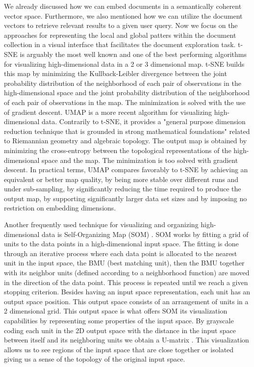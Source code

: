 \documentclass[a4paper]{article}
\begin{document}
We already discussed how we can embed documents in a semantically coherent vector space. Furthermore, we also mentioned how we can utilize the document vectors to retrieve relevant results to a given user query. Now we focus on the approaches for representing the local and global patters within the document collection in a visual interface that facilitates the document exploration task. t-SNE \citep{vandermaaten2008} is arguably the most well known and one of the best performing algorithms for visualizing high-dimensional data in a 2 or 3 dimensional map. t-SNE builds this map by minimizing the Kullback-Leibler divergence between the joint probability distribution of the neighborhood of each pair of observations in the high-dimensional space and the joint probability distribution of the neighborhood of each pair of observations in the map. The minimization is solved with the use of gradient descent. UMAP \citep{mcinnes2020} is a more recent algorithm for visualizing high-dimensional data. Contrarily to t-SNE, it provides a "general purpose dimension reduction technique that is grounded in strong mathematical foundations" \citep{mcinnes2020} related to Riemannian geometry and algebraic topology. The output map is obtained by minimizing the cross-entropy between the topological representations of the high-dimensional space and the map. The minimization is too solved with gradient descent. In practical terms, UMAP compares favorably to t-SNE \citep{mcinnes2020} by achieving an equivalent or better map quality, by being more stable over different runs and under sub-sampling, by significantly reducing the time required to produce the output map, by supporting significantly larger data set sizes and by imposing no restriction on embedding dimensions.

Another frequently used technique for visualizing and organizing high-dimensional data is Self-Organizing Map (SOM) \citep{Kohonen1982}. SOM works by fitting a grid of units to the data points in a high-dimensional input space. The fitting is done through an iterative process where each data point is allocated to the nearest unit in the input space, the BMU (best matching unit), then the BMU together with its neighbor units (defined according to a neighborhood function) are moved in the direction of the data point. This process is repeated until we reach a given stopping criterion. Besides having an input space representation, each unit has an output space position. This output space consists of an arrangement of units in a 2 dimensional grid. This output space is what offers SOM its visualization capabilities by representing some properties of the input space. By grayscale coding each unit in the 2D output space with the distance in the input space between itself and its neighboring units we obtain a U-matrix \citep{ultsch1993}. This visualization allows us to see regions of the input space that are close together or isolated giving us a sense of the topology of the original input space.
\end{document}
